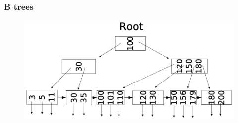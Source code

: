 \documentclass[12pt,a4paper]{article}
\begin{document}
\subsubsection{B trees}
\begin{figure}
\vspace{-5mm}
\includegraphics[scale=0.27]{img/img35.png}
\end{figure}
\end{document}
